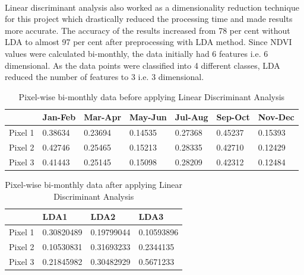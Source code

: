 \documentclass[12pt, a4paper]{report}
\begin{document}
\paragraph{}
Linear discriminant analysis also worked as a dimensionality reduction technique for this project which drastically reduced the processing time and made results more accurate. The accuracy of the results increased from 78 per cent without LDA to almost 97 per cent after preprocessing with LDA method. Since NDVI values were calculated bi-monthly, the data initially had 6 features i.e. 6 dimensional. As the data points were classified into 4 different classes, LDA reduced the number of features to 3 i.e. 3 dimensional.
	\begin{center}
	\begin{table}
	\centering
	\renewcommand{\arraystretch}{1.5}
	\begin{tabular}{|p{1.65cm}|p{1.75cm}|p{1.85cm}|p{1.85cm}|p{1.75cm}|p{1.75cm}|p{1.80cm}|}
	\hline
	~ & \textbf{Jan-Feb} & \textbf{Mar-Apr}& \textbf{May-Jun} & \textbf{Jul-Aug} & \textbf{Sep-Oct} & \textbf{Nov-Dec}  \\
	\hline
	Pixel 1 & 0.38634 & 0.23694 & 0.14535 & 0.27368 & 0.45237 & 0.15393 \\
	\hline
	Pixel 2 & 0.42746 & 0.25465 & 0.15213 & 0.28335 & 0.42710 & 0.12429 \\
	\hline
	Pixel 3 & 0.41443 & 0.25145 & 0.15098 & 0.28209 & 0.42312 & 0.12484 \\
	\hline

	\end{tabular} 
	\caption{Pixel-wise bi-monthly data before applying Linear Discriminant Analysis}
	\end{table}
	\end{center}
	\begin{center}
	\begin{table}
	\centering
	\renewcommand{\arraystretch}{1.5}
	\begin{tabular}{|p{2cm}|p{2cm}|p{2cm}|p{2cm}|}
	\hline
	~ & \textbf{LDA1} & \textbf{LDA2}& \textbf{LDA3} \\
	\hline
	Pixel 1 & 0.30820489 & 0.19799044 & 0.10593896 \\
	\hline
	Pixel 2 & 0.10530831 & 0.31693233 & 0.2344135 \\
	\hline
	Pixel 3 & 0.21845982 & 0.30482929 & 0.5671233 \\
	\hline
	\end{tabular} 
	\caption{Pixel-wise bi-monthly data after applying Linear Discriminant Analysis}
	\end{table}
	\end{center}
\end{document}
